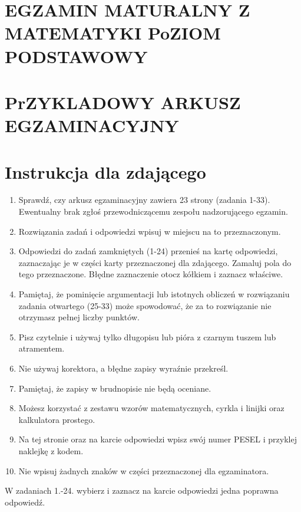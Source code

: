 \documentclass[10pt]{article}
\author{DATA: 16 grudnia 2014 r. Czas pracy: \(\mathbf{1 7 0}\) minut\\
Liczba punktów do uzyskania: 50}
\date{}
\begin{document}
\maketitle
\section*{EGZAMIN MATURALNY Z MATEMATYKI PoZIOM PODSTAWOWY}
\section*{PrZYKLADOWY ARKUSZ EGZAMINACYJNY}


\section*{Instrukcja dla zdającego}
\begin{enumerate}
  \item Sprawdź, czy arkusz egzaminacyjny zawiera 23 strony (zadania 1-33). Ewentualny brak zgłoś przewodniczącemu zespołu nadzorującego egzamin.
  \item Rozwiązania zadań i odpowiedzi wpisuj w miejscu na to przeznaczonym.
  \item Odpowiedzi do zadań zamkniętych (1-24) przenieś na kartę odpowiedzi, zaznaczając je w części karty przeznaczonej dla zdającego. Zamaluj pola do tego przeznaczone. Błędne zaznaczenie otocz kółkiem i zaznacz właściwe.
  \item Pamiętaj, że pominięcie argumentacji lub istotnych obliczeń w rozwiązaniu zadania otwartego (25-33) może spowodować, że za to rozwiązanie nie otrzymasz pełnej liczby punktów.
  \item Pisz czytelnie i używaj tylko długopisu lub pióra z czarnym tuszem lub atramentem.
  \item Nie używaj korektora, a błędne zapisy wyraźnie przekreśl.
  \item Pamiętaj, że zapisy w brudnopisie nie będą oceniane.
  \item Możesz korzystać z zestawu wzorów matematycznych, cyrkla i linijki oraz kalkulatora prostego.
  \item Na tej stronie oraz na karcie odpowiedzi wpisz swój numer PESEL i przyklej naklejkę z kodem.
  \item Nie wpisuj żadnych znaków w części przeznaczonej dla egzaminatora.
\end{enumerate}

W zadaniach 1.-24. wybierz i zaznacz na karcie odpowiedzi jedna poprawna odpowiedź.
\end{document}
